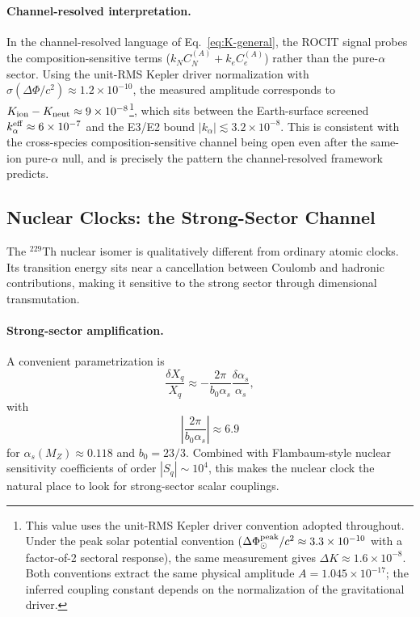\paragraph{Channel-resolved interpretation.}
In the channel-resolved language of Eq.~\eqref{eq:K-general}, the ROCIT signal probes the composition-sensitive terms ($k_N C_N^{(A)} + k_e C_e^{(A)}$) rather than the pure-$\alpha$ sector.  Using the unit-RMS Kepler driver normalization with $\sigma(\Delta\Phi/c^2) \approx 1.2 \times 10^{-10}$, the measured amplitude corresponds to $K_{\rm ion} - K_{\rm neut} \approx 9 \times 10^{-8}$\footnote{This value uses the unit-RMS Kepler driver convention adopted throughout.  Under the peak solar potential convention ($\Delta\Phi_\odot^{\rm peak}/c^2 \approx 3.3 \times 10^{-10}$ with a factor-of-2 sectoral response), the same measurement gives $\Delta K \approx 1.6 \times 10^{-8}$.  Both conventions extract the same physical amplitude $A = 1.045 \times 10^{-17}$; the inferred coupling constant depends on the normalization of the gravitational driver.}, which sits between the Earth-surface screened $k_\alpha^{\rm eff} \approx 6 \times 10^{-7}$ and the E3/E2 bound $|k_\alpha| \lesssim 3.2 \times 10^{-8}$.  This is consistent with the cross-species composition-sensitive channel being open even after the same-ion pure-$\alpha$ null, and is precisely the pattern the channel-resolved framework predicts.

\subsection{Nuclear Clocks: the Strong-Sector Channel}\label{sec:clocks-nuclear}

The $^{229}$Th nuclear isomer is qualitatively different from ordinary atomic clocks.  Its transition energy sits near a cancellation between Coulomb and hadronic contributions, making it sensitive to the strong sector through dimensional transmutation.

\paragraph{Strong-sector amplification.}
A convenient parametrization is
\begin{equation}\label{eq:dimtrans}
\frac{\delta X_q}{X_q}\approx -\frac{2\pi}{b_0\alpha_s}\frac{\delta\alpha_s}{\alpha_s},
\end{equation}
with
\begin{equation}
\left|\frac{2\pi}{b_0\alpha_s}\right|\approx 6.9
\end{equation}
for $\alpha_s(M_Z)\approx 0.118$ and $b_0=23/3$.  Combined with Flambaum-style nuclear sensitivity coefficients of order $|S_q|\sim10^4$, this makes the nuclear clock the natural place to look for strong-sector scalar couplings.

